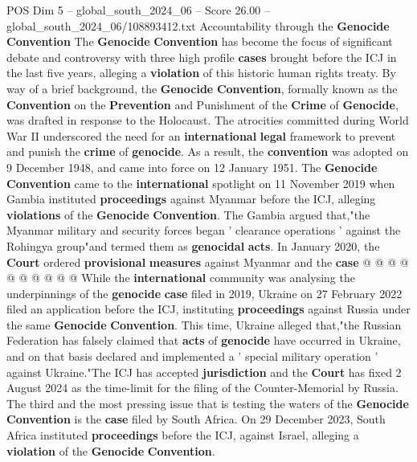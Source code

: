 \begin{textsample}{POS Dim 5 – global\_south\_2024\_06 – Score 26.00 – global\_south\_2024\_06/108893412.txt}  \label{ex:f5_pos_221}
Accountability through the \textbf{Genocide} \textbf{Convention} The \textbf{Genocide} \textbf{Convention} has become the focus of significant debate and controversy with three high profile \textbf{cases} brought before the ICJ in the last five years, alleging a \textbf{violation} of this historic human rights treaty.
By way of a brief background, the \textbf{Genocide} \textbf{Convention}, formally known as the \textbf{Convention} on the \textbf{Prevention} and Punishment of the \textbf{Crime} of \textbf{Genocide}, was drafted in response to the Holocaust.
The atrocities committed during World War II underscored the need for an \textbf{international} \textbf{legal} framework to prevent and punish the \textbf{crime} of \textbf{genocide}.
As a result, the \textbf{convention} was adopted on 9 December 1948, and came into force on 12 January 1951.
The \textbf{Genocide} \textbf{Convention} came to the \textbf{international} spotlight on 11 November 2019 when Gambia instituted \textbf{proceedings} against Myanmar before the ICJ, alleging \textbf{violations} of the \textbf{Genocide} \textbf{Convention}.
The Gambia argued that,"the Myanmar military and security forces began ' clearance operations ' against the Rohingya group"and termed them as \textbf{genocidal} \textbf{acts}.
In January 2020, the \textbf{Court} ordered \textbf{provisional} \textbf{measures} against Myanmar and the \textbf{case} @ @ @ @ @ @ @ @ @ @ While the \textbf{international} community was analysing the underpinnings of the \textbf{genocide} \textbf{case} filed in 2019, Ukraine on 27 February 2022 filed an application before the ICJ, instituting \textbf{proceedings} against Russia under the same \textbf{Genocide} \textbf{Convention}.
This time, Ukraine alleged that,"the Russian Federation has falsely claimed that \textbf{acts} of \textbf{genocide} have occurred in Ukraine, and on that basis declared and implemented a ' special military operation ' against Ukraine."The ICJ has accepted \textbf{jurisdiction} and the \textbf{Court} has fixed 2 August 2024 as the time-limit for the filing of the Counter-Memorial by Russia.
The third and the most pressing issue that is testing the waters of the \textbf{Genocide} \textbf{Convention} is the \textbf{case} filed by South Africa.
On 29 December 2023, South Africa instituted \textbf{proceedings} before the ICJ, against Israel, alleging a \textbf{violation} of the \textbf{Genocide} \textbf{Convention}.

\end{textsample}
